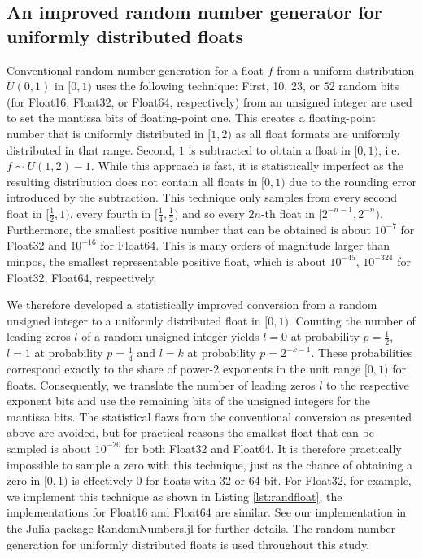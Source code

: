 \subsection{An improved random number generator for uniformly distributed floats}

Conventional random number generation for a float $f$ from a uniform distribution $U(0,1)$
in $[0,1)$ uses the following technique: First, 10, 23, or 52 random bits (for Float16, Float32, or Float64, respectively)
from an unsigned integer are used to set the mantissa bits of floating-point one. This creates a floating-point
number that is uniformly distributed in $[1,2)$ as all float formats are uniformly distributed in that range. Second,
$1$ is subtracted to obtain a float in $[0,1)$, i.e. $f \sim U(1,2) - 1$. While this approach is fast, it is statistically
imperfect as the resulting distribution does not contain all floats in $[0,1)$ due to the rounding error introduced
by the subtraction. This technique only samples from every second float in $[\tfrac{1}{2},1)$, every fourth in
$[\tfrac{1}{4},\tfrac{1}{2})$ and so every $2n$-th float in $[2^{-n-1},2^{-n})$. Furthermore, the smallest positive
number that can be obtained is about $10^{-7}$ for Float32 and $10^{-16}$ for Float64. This is many orders of
magnitude larger than minpos, the smallest representable positive float, which is about $10^{-45}$, $10^{-324}$ for
Float32, Float64, respectively.

We therefore developed a statistically improved conversion from a random unsigned integer to a uniformly distributed
float in $[0,1)$. Counting the number of leading zeros $l$ of a random unsigned integer yields $l = 0$ at probability
$p = \tfrac{1}{2}$, $l=1$ at probability $p=\tfrac{1}{4}$ and $l = k$ at probability $p=2^{-k-1}$. These probabilities
correspond exactly to the share of power-2 exponents in the unit range $[0,1)$ for floats.
Consequently, we translate the number of leading zeros $l$  to the respective exponent bits and use the remaining
bits of the unsigned integers for the mantissa bits. The statistical flaws from the conventional conversion as presented
above are avoided, but for practical reasons the smallest float that can be sampled is about $10^{-20}$ for both Float32
and Float64. It is therefore practically impossible to sample a zero with this technique, just as the chance of obtaining a
zero in $[0,1)$ is effectively 0 for floats with 32 or 64 bit. For Float32, for example, we implement this technique as shown
in Listing \ref{lst:randfloat}, the implementations for Float16 and Float64 are similar. See our implementation in the Julia-package
\href{https://github.com/JuliaRandom/RandomNumbers.jl}{RandomNumbers.jl} for further details. The random number generation
for uniformly distributed floats is used throughout this study.

